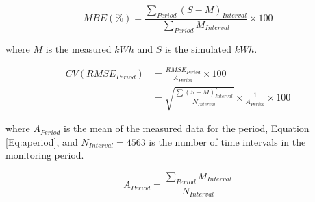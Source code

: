 \begin{equation}\label{Eq:mbe}
MBE(\%) = \frac{\sum_{Period}{(S-M)_{Interval}}}{\sum_{Period}{M_{Interval}}} \times 100
\end{equation}

where $M$ is the measured $kWh$ and $S$ is the simulated $kWh$.

\begin{align}\label{Eq:cvrmse}
\nonumber CV(RMSE_{Period}) &= \frac{RMSE_{Period}}{A_{Period}} \times 100 \\
				            &= \sqrt{\frac{\sum{(S-M)^2_{Interval}}}{N_{Interval}}} \times \frac 1{A_{Period}} \times 100
\end{align}

where $A_{Period}$ is the mean of the measured data for the period, Equation \eqref{Eq:aperiod}, and $N_{Interval} = 4563$ is the number of time intervals in the monitoring period.

\begin{equation}\label{Eq:aperiod}
A_{Period} = \frac{\sum_{Period}{M_{Interval}}}{N_{Interval}}
\end{equation}

